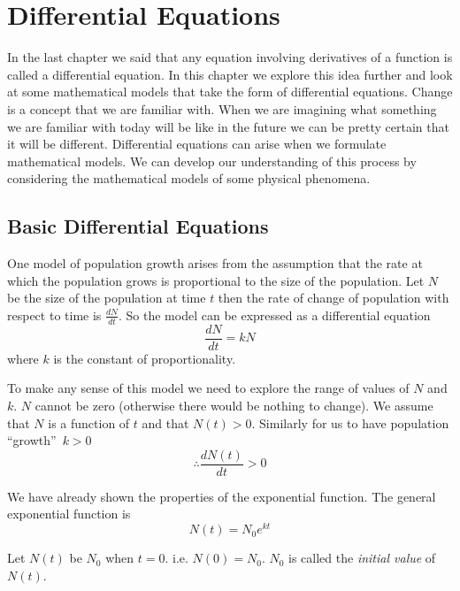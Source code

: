 \chapter{Differential Equations}
In the last chapter we said that any equation involving derivatives of a function is called a differential equation.  In this chapter we explore this idea further and look at some mathematical models that take the form of differential equations.  Change is a concept that we are familiar with.  When we are imagining what something we are familiar with today will be like in the future we can be pretty certain that it will be different.  Differential equations can arise when we formulate mathematical models.  We can develop our understanding of this process by considering the mathematical models of some physical phenomena. 

\section{Basic Differential Equations}
One model of population growth arises from the assumption that the rate at which the population grows is proportional to the size of the population.
Let $N$ be the size of the population at time $t$ then the rate of change of population with respect to time is $\frac{d N}{d t}\text{.}$  So the model can be expressed as a differential equation
\begin{equation*}\frac{d N}{d t} =k N
\end{equation*}
where $k$ is the constant of proportionality. 

To make any sense of this model we need to explore the range of values of $N$ and $k$.  $N$ cannot be zero (otherwise there would be nothing to change).  We assume that $N$ is a function of $t$ and that $N (t) >0$.  Similarly for us to have population ``growth''\  $k >0$
\begin{equation*} \therefore \frac{d N (t)}{d t} >0
\end{equation*}

We have already shown the properties of the exponential function.  The general exponential function is
\begin{equation*}N (t) =N_{0} e^{k t}
\end{equation*}

Let $N (t)$ be $N_{0}$ when $t =0$.  i.e. $N (0) =N_{0}\text{.}$  $N_{0}$ is called the \emph{initial value} of $N (t)$. 

